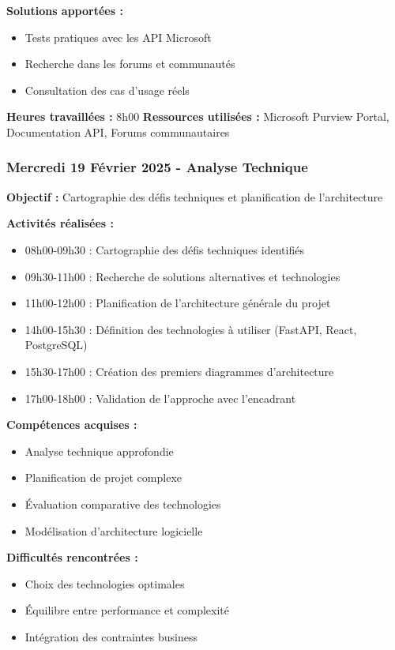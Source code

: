 \textbf{Solutions apportées :}
\begin{itemize}
    \item Tests pratiques avec les API Microsoft
    \item Recherche dans les forums et communautés
    \item Consultation des cas d'usage réels
\end{itemize}

\textbf{Heures travaillées :} 8h00
\textbf{Ressources utilisées :} Microsoft Purview Portal, Documentation API, Forums communautaires

\subsubsection{Mercredi 19 Février 2025 - Analyse Technique}
\textbf{Objectif :} Cartographie des défis techniques et planification de l'architecture

\textbf{Activités réalisées :}
\begin{itemize}
    \item 08h00-09h30 : Cartographie des défis techniques identifiés
    \item 09h30-11h00 : Recherche de solutions alternatives et technologies
    \item 11h00-12h00 : Planification de l'architecture générale du projet
    \item 14h00-15h30 : Définition des technologies à utiliser (FastAPI, React, PostgreSQL)
    \item 15h30-17h00 : Création des premiers diagrammes d'architecture
    \item 17h00-18h00 : Validation de l'approche avec l'encadrant
\end{itemize}

\textbf{Compétences acquises :}
\begin{itemize}
    \item Analyse technique approfondie
    \item Planification de projet complexe
    \item Évaluation comparative des technologies
    \item Modélisation d'architecture logicielle
\end{itemize}

\textbf{Difficultés rencontrées :}
\begin{itemize}
    \item Choix des technologies optimales
    \item Équilibre entre performance et complexité
    \item Intégration des contraintes business
\end{itemize}

